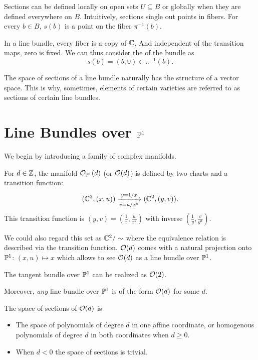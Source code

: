 \documentclass[12pt]{memoir}
\begin{document}
    Sections can be defined locally on open sets $U\subseteq B$ or globally when they are defined everywhere on $B$. Intuitively, sections single out points in fibers. For every $b\in B$, $s(b)$ is a point on the fiber $\pi^{-1}(b)$.

    \begin{Ex}
        In a line bundle, every fiber is a copy of $\mathbb{C}$. And independent of the transition maps, zero is fixed. We can thus consider the  of the bundle as 
        $$s(b)=(b,0)\in\pi^{-1}(b).$$
    \end{Ex}

    The space of sections of a line bundle naturally has the structure of a vector space. This is why, sometimes, elements of certain varieties are referred to as sections of certain line bundles. 

    \section{Line Bundles over $\mathbb{P}^1$}

    We begin by introducing a family of complex manifolds.

\begin{Def}
    For $d\in\mathbb{Z}$, the manifold $\mathcal{O}_{\mathbb{P}^1}(d)$ (or $\mathcal{O}(d)$) is defined by two charts and a transition function:
    $$(\mathbb{C}^2,(x,u))\xrightarrow[v=u/x^d]{y=1/x}(\mathbb{C}^2,(y,v)).$$
    This transition function is  $(y,v)=\left(\frac{1}{x},\frac{u}{x^d}\right)$ with inverse $\left(\frac{1}{y},\frac{v}{y^d}\right)$.
\end{Def}

We could also regard this set as $\mathbb{C}^2/\sim$ where the equivalence relation is described via the transition function. $\mathcal{O}(d)$ comes with a natural projection onto $\mathbb{P}^1$: $(x,u)\mapsto x$ which allows to see $\mathcal{O}(d)$ as a line bundle over $\mathbb{P}^1$. 

\begin{Ex}
The tangent bundle over $\mathbb{P}^1$ can be realized as $\mathcal{O}(2)$. 
\end{Ex}

Moreover, \emph{any} line bundle over $\mathbb{P}^1$ is of the form $\mathcal{O}(d)$ for some $d$.  

\begin{Prop}
The space of sections of $\mathcal{O}(d)$ is
\begin{itemize}
    \item The space of polynomials of degree $d$ in one affine coordinate, or homogenous polynomials of degree $d$ in both coordinates when $d\geq 0$.
    \item When $d<0$ the space of sections is trivial.
\end{itemize}
\end{Prop}
\end{document}
